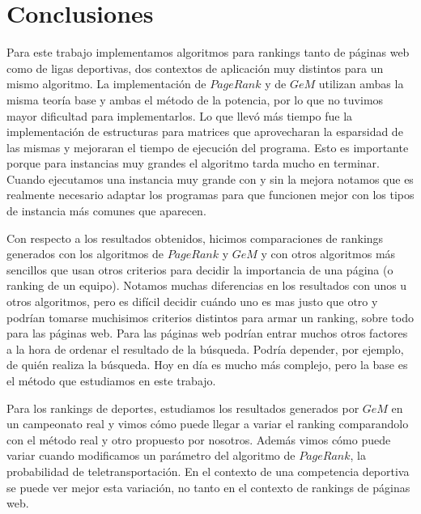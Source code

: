 \section{Conclusiones}

Para este trabajo implementamos algoritmos para rankings tanto de páginas web como de ligas deportivas, dos contextos de aplicación muy distintos para un mismo algoritmo. La implementación de $PageRank$ y de $GeM$ utilizan ambas la misma teoría base y ambas el método de la potencia, por lo que no tuvimos mayor dificultad para implementarlos. Lo que llevó más tiempo fue la implementación de estructuras para matrices que aprovecharan la esparsidad de las mismas y mejoraran el tiempo de ejecución del programa. Esto es importante porque para instancias muy grandes el algoritmo tarda mucho en terminar. Cuando ejecutamos una instancia muy grande con y sin la mejora notamos que es realmente necesario adaptar los programas para que funcionen mejor con los tipos de instancia más comunes que aparecen.

Con respecto a los resultados obtenidos, hicimos comparaciones de rankings generados con los algoritmos de $PageRank$ y $GeM$ y con otros algoritmos más sencillos que usan otros criterios para decidir la importancia de una página (o ranking de un equipo). Notamos muchas diferencias en los resultados con unos u otros algoritmos, pero es difícil decidir cuándo uno es mas justo que otro y podrían tomarse muchisimos criterios distintos para armar un ranking, sobre todo para las páginas web. Para las páginas web podrían entrar muchos otros factores a la hora de ordenar el resultado de la búsqueda. Podría depender, por ejemplo, de quién realiza la búsqueda. Hoy en día es mucho más complejo, pero la base es el método que estudiamos en este trabajo. 

Para los rankings de deportes, estudiamos los resultados generados por $GeM$ en un campeonato real y vimos cómo puede llegar a variar el ranking comparandolo con el método real y otro propuesto por nosotros. Además vimos cómo puede variar cuando modificamos un parámetro del algoritmo de $PageRank$, la probabilidad de teletransportación. En el contexto de una competencia deportiva se puede ver mejor esta variación, no tanto en el contexto de rankings de páginas web.

















